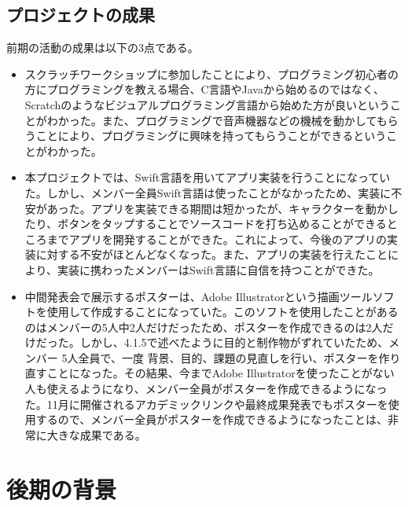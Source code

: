 \documentclass[openany,11pt,papersize]{jsbook}
\begin{document}
\section{プロジェクトの成果}
\par 前期の活動の成果は以下の3点である。
\begin{itemize}
\item スクラッチワークショップに参加したことにより、プログラミング初心者の方にプログラミングを教える場合、C言語やJavaから始めるのではなく、Scratchのようなビジュアルプログラミング言語から始めた方が良いということがわかった。また、プログラミングで音声機器などの機械を動かしてもらうことにより、プログラミングに興味を持ってもらうことができるということがわかった。
\item 
本プロジェクトでは、Swift言語を用いてアプリ実装を行うことになっていた。しかし、メンバー全員Swift言語は使ったことがなかったため、実装に不安があった。アプリを実装できる期間は短かったが、キャラクターを動かしたり、ボタンをタップすることでソースコードを打ち込めることができるところまでアプリを開発することができた。これによって、今後のアプリの実装に対する不安がほとんどなくなった。また、アプリの実装を行えたことにより、実装に携わったメンバーはSwift言語に自信を持つことができた。

\item 中間発表会で展示するポスターは、Adobe Illustratorという描画ツールソフトを使用して作成することになっていた。このソフトを使用したことがあるのはメンバーの5人中2人だけだったため、ポスターを作成できるのは2人だけだった。しかし、4.1.5で述べたように目的と制作物がずれていたため、メンバー 5人全員で、一度 背景、目的、課題の見直しを行い、ポスターを作り直すことになった。その結果、今までAdobe Illustratorを使ったことがない人も使えるようになり、メンバー全員がポスターを作成できるようになった。11月に開催されるアカデミックリンクや最終成果発表でもポスターを使用するので、メンバー全員がポスターを作成できるようになったことは、非常に大きな成果である。
\end{itemize}




\chapter{後期の背景}
\end{document}
